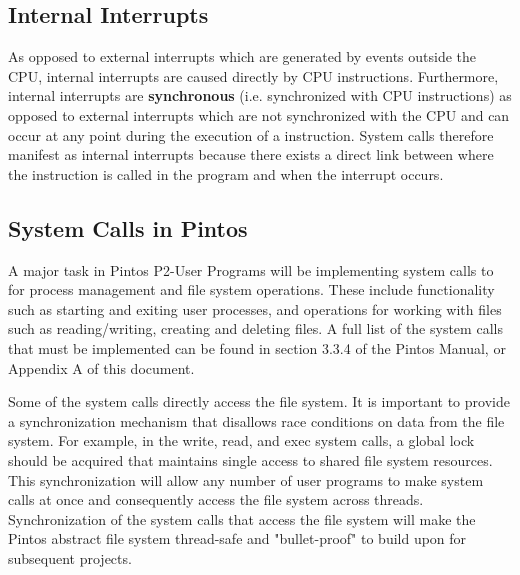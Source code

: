 \documentclass[11pt, letterpaper]{article}
\begin{document}
\subsection{Internal Interrupts}
As opposed to external interrupts which are generated by events outside the CPU, internal interrupts are caused directly by CPU instructions. Furthermore, internal interrupts are \textbf{synchronous} (i.e. synchronized with CPU instructions) as opposed to external interrupts which are not synchronized with the CPU and can occur at any point during the execution of a instruction. System calls therefore manifest as internal interrupts because there exists a direct link between where the instruction is called in the program and when the interrupt occurs.

\subsection{System Calls in Pintos}
A major task in Pintos P2-User Programs will be implementing system calls to for process management and file system operations. These include functionality such as starting and exiting user processes, and operations for working with files such as reading/writing, creating and deleting files. A full list of the system calls that must be implemented can be found in section 3.3.4 of the Pintos Manual, or Appendix A of this document.

Some of the system calls directly access the file system. It is important to provide a synchronization mechanism that disallows race conditions on data from the file system. For example, in the write, read, and exec system calls, a global lock should be acquired that maintains single access to shared file system resources. This synchronization will allow any number of user programs to make system calls at once and consequently access the file system across threads. Synchronization of the system calls that access the file system will make the Pintos abstract file system thread-safe and "bullet-proof" to build upon for subsequent projects. 
\end{document}
